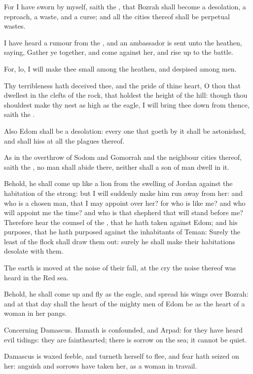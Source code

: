 \Verse For I have sworn by myself, saith the \LORD, that Bozrah shall become a desolation, a reproach, a waste, and a curse; and all the cities thereof shall be perpetual wastes.

\Verse I have heard a rumour from the \LORD, and an ambassador is sent unto the heathen, saying, Gather ye together, and come against her, and rise up to the battle.

\Verse For, lo, I will make thee small among the heathen, and despised among men.

\Verse Thy terribleness hath deceived thee, and the pride of thine heart, O thou that dwellest in the clefts of the rock, that holdest the height of the hill: though thou shouldest make thy nest as high as the eagle, I will bring thee down from thence, saith the \LORD.

\Verse Also Edom shall be a desolation: every one that goeth by it shall be astonished, and shall hiss at all the plagues thereof.

\Verse As in the overthrow of Sodom and Gomorrah and the neighbour cities thereof, saith the \LORD, no man shall abide there, neither shall a son of man dwell in it.

\Verse Behold, he shall come up like a lion from the swelling of Jordan against the habitation of the strong: but I will suddenly make him run away from her: and who is a chosen man, that I may appoint over her?  for who is like me? and who will appoint me the time? and who is that shepherd that will stand before me?  \Verse Therefore hear the counsel of the \LORD, that he hath taken against Edom; and his purposes, that he hath purposed against the inhabitants of Teman: Surely the least of the flock shall draw them out: surely he shall make their habitations desolate with them.

\Verse The earth is moved at the noise of their fall, at the cry the noise thereof was heard in the Red sea.

\Verse Behold, he shall come up and fly as the eagle, and spread his wings over Bozrah: and at that day shall the heart of the mighty men of Edom be as the heart of a woman in her pangs.

\Verse Concerning Damascus. Hamath is confounded, and Arpad: for they have heard evil tidings: they are fainthearted; there is sorrow on the sea; it cannot be quiet.

\Verse Damascus is waxed feeble, and turneth herself to flee, and fear hath seized on her: anguish and sorrows have taken her, as a woman in travail.


